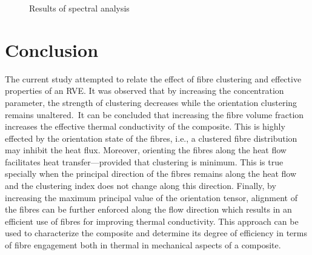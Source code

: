 \begin{figure}[!h]
	\centering
	\hfill
	\caption{Results of spectral analysis}\label{fig:hc2_spectral}
\end{figure}


\section{Conclusion}
\red
	The current study attempted to relate the effect of fibre clustering and effective properties of an RVE. It was observed that by increasing the concentration parameter, the strength of clustering decreases while the orientation clustering remains unaltered.\bl~It can be concluded that increasing the fibre volume fraction increases the effective thermal conductivity of the composite. This is highly effected by the orientation state of the fibres, i.e., a clustered fibre distribution may inhibit the heat flux. Moreover, orienting the fibres along the heat flow facilitates heat transfer---provided that clustering is minimum. This is true specially when the principal direction of the fibres remains along the heat flow and the clustering index does not change along this direction. Finally, by increasing the maximum principal value of the orientation tensor, alignment of the fibres can be further enforced along the flow direction which results in an efficient use of fibres for improving thermal conductivity. This approach can be used to characterize the composite and determine its degree of efficiency in terms of fibre engagement both in thermal in mechanical aspects of a composite.
